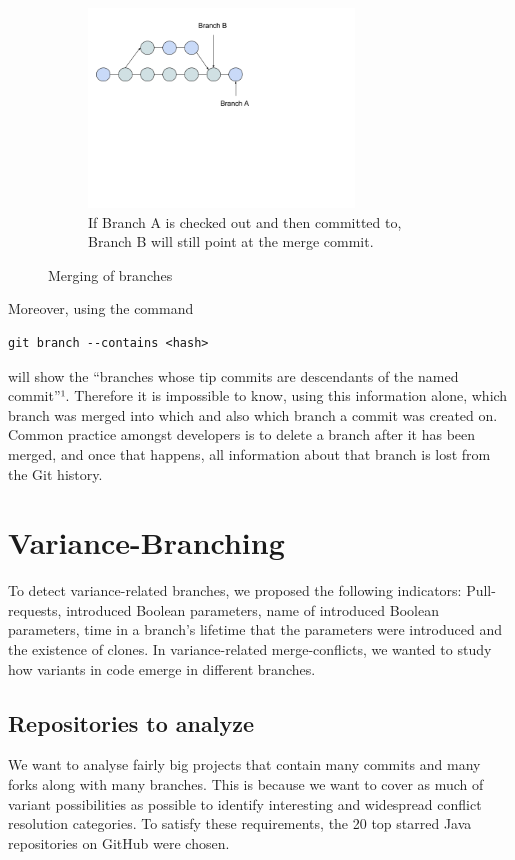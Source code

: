 \begin{figure}
  \begin{subfigure}[b]{0.3\textwidth}
      \includegraphics[width=200pt]{figure/branch3.png}
      \caption{If Branch A is checked out and then committed to, Branch B will still point at the merge commit.}
      \label{fig:mbranch3}
  \end{subfigure}
  \caption{Merging of branches}\label{fig:branches}
\end{figure}

Moreover, using the command
\lstset{language=Bash}
\begin{lstlisting}[frame=single]
git branch --contains <hash>
\end{lstlisting}
will show the “branches whose tip commits are descendants of the named commit”¹. Therefore it is impossible to know, using this information alone, which branch was merged into which and also which branch a commit was created on. Common practice amongst developers is to delete a branch after it has been merged, and once that happens, all information about that branch is lost from the Git history.
\section{Variance-Branching}
To detect variance-related branches, we proposed the following indicators: Pull-requests, introduced Boolean parameters, name of introduced Boolean parameters, time in a branch’s lifetime that the parameters were introduced and the existence of clones. In variance-related merge-conflicts, we wanted to study how variants in code emerge in different branches.
\subsection{Repositories to analyze}
We want to analyse fairly big projects that contain many commits and many forks along with many branches. This is because we want to cover as much of variant possibilities as possible to identify interesting and widespread conflict resolution categories. To satisfy these requirements, the 20 top starred Java repositories on GitHub were chosen.

